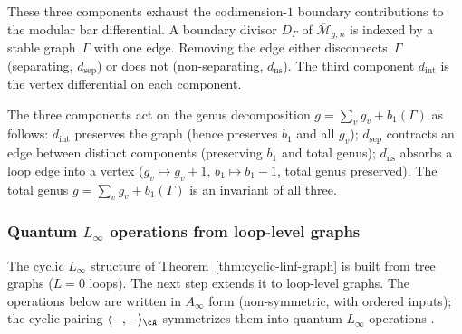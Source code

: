 \begin{remark}
\label{rem:genus-decomposition}
These three components exhaust the codimension-$1$ boundary
contributions to the modular bar differential.
A boundary divisor $D_\Gamma$ of
$\overline{\mathcal{M}}_{g,n}$ is indexed by a stable graph~$\Gamma$ with one edge.
Removing the edge either disconnects~$\Gamma$ (separating,
$d_{\mathrm{sep}}$) or does not (non-separating,
$d_{\mathrm{ns}}$). The third component $d_{\mathrm{int}}$ is
the vertex differential on each
component.

The three components act on the genus decomposition
$g = \sum_v g_v + b_1(\Gamma)$ as follows:
$d_{\mathrm{int}}$ preserves the graph
(hence preserves $b_1$ and all $g_v$);
$d_{\mathrm{sep}}$ contracts an edge between distinct components
(preserving $b_1$ and total genus);
$d_{\mathrm{ns}}$ absorbs a loop edge into a vertex
($g_v \mapsto g_v + 1$, $b_1 \mapsto b_1 - 1$, total
genus preserved).
The total genus $g = \sum_v g_v + b_1(\Gamma)$ is an invariant
of all three.
\end{remark}

\subsubsection{Quantum \texorpdfstring{$L_\infty$}{L-infinity} operations from loop-level graphs}
\label{subsubsec:quantum-linf-from-graphs}

The cyclic $L_\infty$ structure of
Theorem~\ref{thm:cyclic-linf-graph} is built from tree graphs
($L = 0$ loops). The next step extends it to loop-level graphs.
The operations below are written in $A_\infty$ form
(non-symmetric, with ordered inputs); the cyclic pairing
$\langle -, - \rangle_\cA$ symmetrizes them into quantum
$L_\infty$ operations \cite{BL15, Markl06}.

